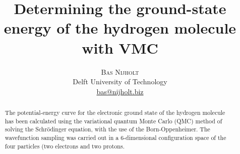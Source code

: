 \documentclass[twoside]{article}
\title{\vspace{-15mm}\fontsize{24pt}{10pt}\selectfont\textbf{Determining the ground-state energy of the hydrogen molecule with VMC}} %
\author{
\large
\textsc{Bas \textsc{Nijholt}}\\[2mm] %
\normalsize Delft University of Technology \\ %
\normalsize \href{mailto:bas@nijholt.biz}{bas@nijholt.biz} %
\vspace{-5mm}
}
\date{}
\begin{document}
\maketitle %

\thispagestyle{fancy} %


\begin{abstract}

\noindent The potential-energy curve for the electronic ground state of the hydrogen molecule has been calculated using the variational quantum Monte Carlo (QMC) method of solving the Schr\"odinger equation, with the use of the Born-Oppenheimer. The wavefunction sampling was carried out in a 6-dimensional configuration space of the four particles (two electrons and two protons.  %

\end{abstract}

\end{document}
